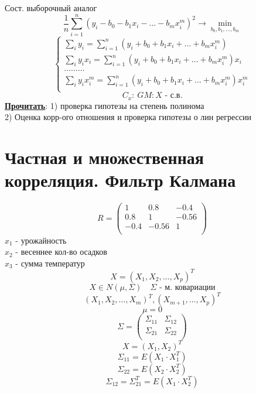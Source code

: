 \documentclass[a4paper]{article}
\begin{document}
Сост. выборочный аналог 
\begin{equation}
    \frac{1}{n} \sum_{i=1}^{n} (y_i - b_0 - b_1 x_i - \dots - b_m x_i^{m})^2
    \to \min_{b_0, b_1, \dots , b_m}
\end{equation}
\begin{equation}
    \begin{cases}
        \sum_{i} y_i = \sum_{i=1}^{n} (y_i + b_0 + b_1 x_i + \dots + b_m x_i^{m})\\
        \sum_{i} y_ix_i = \sum_{i=1}^{n} (y_i + b_0 + b_1 x_i + \dots + b_m x_i^{m})x_i\\
        \dots\dots\dots\\
        \sum_{i} y_ix_i^{m} = \sum_{i=1}^{n} (y_i + b_0 + b_1 x_i + \dots + b_m x_i^{m})x_i^{m}\\
    \end{cases}
\end{equation}
\[
    C_x:\  GM: X \text{ - с.в.}
\]
\underline{\textbf{Прочитать}}: 1) проверка гипотезы на степень полинома\\
2) Оценка корр-ого отношения и проверка гипотезы о лин регрессии

\section*{Частная и множественная корреляция. Фильтр Калмана}
\[
    R = \begin{pmatrix}
    1 & 0.8 & -0.4\\
    0.8 & 1 & -0.56\\
    -0.4 & -0.56 & 1\\
    \end{pmatrix}
\]
$ x_1 $ - урожайность\\
$ x_2 $ - весеннее кол-во осадков\\
$ x_3 $ - сумма температур
\[
    X = (X_1, X_2, \dots , X_p)^{T}
\]
\[
    X \in N(\mu, \Sigma) \quad \Sigma \text{ - м. ковариации}
\]
\[
    (X_1, X_2, \dots , X_m)^{T}, (X_{m+1}, \dots , X_p)^{T}
\]
\[
    \mu = 0
\]
\[
    \Sigma = \begin{pmatrix}
    \Sigma_{11} & \Sigma_{12}\\
    \Sigma_{21} &\Sigma_{22} \\
    
    \end{pmatrix}
\]
\[
    X = (X_1, X_2)^{T}
\]
\[
    \Sigma_{11} = E(X_1 \cdot X_1^{T})
\]
\[
    \Sigma_{22} = E(X_2 \cdot X_2^{T})
\]
\[
    \Sigma_{12} = \Sigma_{21}^{T} = E(X_1 \cdot X_2^{T})
\]
\end{document}
